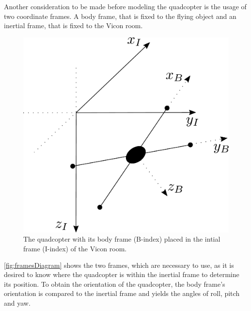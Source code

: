 Another consideration to be made before modeling the quadcopter is the usage of two coordinate frames. A body frame, that is fixed to the flying object and an inertial frame, that is fixed to the Vicon room. 
%
\begin{figure}[H]
    \centering
    \includegraphics[scale=0.25]{figures/framesDiagram}
    \caption{The quadcopter with its body frame (B-index) placed in the intial frame (I-index) of the Vicon room. }
    \label{fig:framesDiagram}
\end{figure}

\autoref{fig:framesDiagram} shows the two frames, which are necessary to use, as it is desired to know where the quadcopter is within the inertial frame to determine its position. To obtain the orientation of the quadcopter, the body frame's orientation is compared to the inertial frame and yields the angles of roll, pitch and yaw. 

